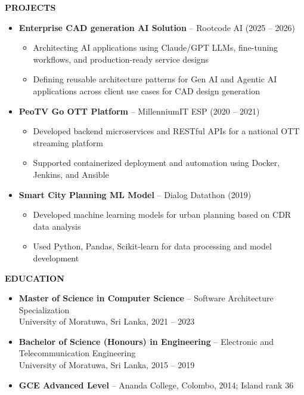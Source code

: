 \documentclass[a4paper,10pt]{article}
\newcommand{\ressection}[1]{
  \vspace{0.2em}
  \noindent\textbf{\large #1}
  \vspace{0.1em}
  \par
}
\begin{document}
\vspace{0.5em}
\ressection{PROJECTS}
\begin{itemize}
    \item \textbf{Enterprise CAD generation AI Solution } -- Rootcode AI (2025 -- 2026)
          \begin{itemize}[leftmargin=0.25in,label=$\circ$,itemsep=1pt]
              \item Architecting AI applications using Claude/GPT LLMs, fine-tuning workflows, and production-ready service designs
              \item Defining reusable architecture patterns for Gen AI and Agentic AI applications across client use cases for CAD design generation
          \end{itemize}
          
    \item \textbf{PeoTV Go OTT Platform} -- MillenniumIT ESP (2020 -- 2021)
          \begin{itemize}[leftmargin=0.25in,label=$\circ$,itemsep=1pt]
              \item Developed backend microservices and RESTful APIs for a national OTT streaming platform
              \item Supported containerized deployment and automation using Docker, Jenkins, and Ansible
          \end{itemize}
          
    \item \textbf{Smart City Planning ML Model} -- Dialog Datathon (2019)
          \begin{itemize}[leftmargin=0.25in,label=$\circ$,itemsep=1pt]
              \item Developed machine learning models for urban planning based on CDR data analysis
              \item Used Python, Pandas, Scikit-learn for data processing and model development
          \end{itemize}
\end{itemize}

\vspace{0.5em}
\ressection{EDUCATION}
\begin{itemize}
    \item \textbf{Master of Science in Computer Science} -- Software Architecture Specialization \\
          University of Moratuwa, Sri Lanka, 2021 -- 2023
    \item \textbf{Bachelor of Science (Honours) in Engineering} -- Electronic and Telecommunication Engineering \\
          University of Moratuwa, Sri Lanka, 2015 -- 2019
    \item \textbf{GCE Advanced Level} -- Ananda College, Colombo, 2014; Island rank 36
\end{itemize}
\end{document}
